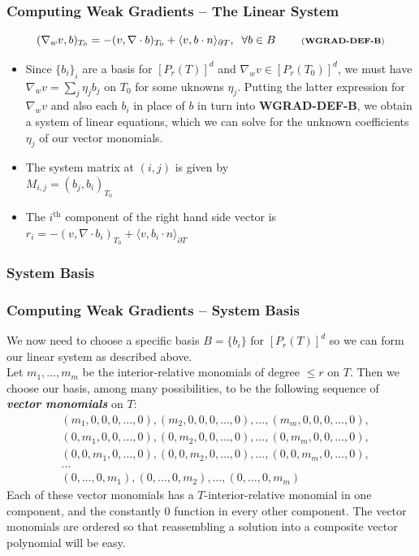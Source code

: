 \documentclass[compress]{beamer}
\begin{document}
\begin{frame}
  \frametitle{Computing Weak Gradients -- The Linear System}
  \begin{equation*}
    (\nabla_w v, b)_{T_0} = -(v, \nabla \cdot b)_{T_0} + \langle v, b \cdot n \rangle_{\partial T}, \;\; \forall b \in B 
    \;\quad\quad \text{\scriptsize (\textbf{WGRAD-DEF-B})}
  \end{equation*}
  \pause
  \begin{itemize}[<+->]
    \item Since $\{b_i\}_i$ are a basis for $[P_r(T)]^d$ and $\nabla_w v \in [P_r(T_0)]^d$, we must have
      $\nabla_w v = \sum_j {\eta_j b_j}$ on $T_0$ for some uknowns $\eta_j$.
      Putting the latter expression for $\nabla_w v$ and also each $b_i$ in place of $b$ in turn into
      {\scriptsize \textbf{WGRAD-DEF-B}}, we obtain a system of linear equations, which we can solve for
      the unknown coefficients $\eta_j$ of our vector monomials. 
    \item The system matrix at $(i,j)$ is given by\\ $M_{i,j} = (b_j, b_i)_{T_0}$
    \item The $i^{\text{th}}$ component of the right hand side vector is 
      $r_i = -(v, \nabla \cdot b_i)_{T_0} + \langle v, b_i \cdot n \rangle_{\partial T}$
  \end{itemize}
\end{frame}

\subsubsection{System Basis}

\begin{frame}
  \frametitle{Computing Weak Gradients -- System Basis}
  We now need to choose a specific basis $B=\{b_i\}$ for $[P_r(T)]^d$ so we can form our linear system as described above.\\
  \pause
  Let $m_1,\dots,m_m$ be the interior-relative monomials of degree $\le r$ on $T$. Then we choose our basis,
  among many possibilities, to be the following sequence of \emph{\textbf{vector monomials}} on $T$:
  \begin{align*}
    &(m_1,0,0,0,\dots,0), (m_2,0,0,0,\dots,0), \dots, (m_m,0,0,0,\dots,0),\\
    &(0,m_1,0,0,\dots,0), (0,m_2,0,0,\dots,0), \dots, (0,m_m,0,0,\dots,0),\\
    &(0,0,m_1,0,\dots,0), (0,0,m_2,0,\dots,0), \dots, (0,0,m_m,0,\dots,0),\\
    &\dots\\
    &(0,\dots,0,m_1), (0,\dots,0,m_2), \dots, (0,\dots,0,m_m)
  \end{align*}
  \pause
  Each of these vector monomials has a $T$-interior-relative monomial in one component, and the constantly $0$ function in
  every other component.  The vector monomials are ordered so that reassembling a solution into a composite vector polynomial
  will be easy. 
\end{frame}
\end{document}
